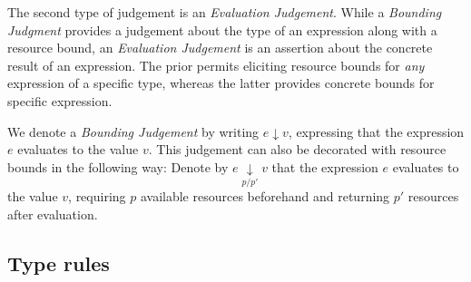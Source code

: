  The second type of judgement is an \emph{Evaluation Judgement}. While a \emph{Bounding Judgment} provides a judgement about the type of an expression along with a resource bound, an \emph{Evaluation Judgement} is an assertion about the concrete result of an expression. The prior permits eliciting resource bounds for \emph{any} expression of a specific type, whereas the latter provides concrete bounds for specific expression. 

 We denote a \emph{Bounding Judgement} by writing \(e \downarrow v\), expressing that the expression \(e\) evaluates to the value \(v\). This judgement can also be decorated with resource bounds in the following way: Denote by \(e \underset{p/p'}{\downarrow} v\) that the expression \(e\) evaluates to the value \(v\), requiring \(p\) available resources beforehand and returning \(p'\) resources after evaluation.


\subsection{Type rules}
\label{sec:type-rules}
